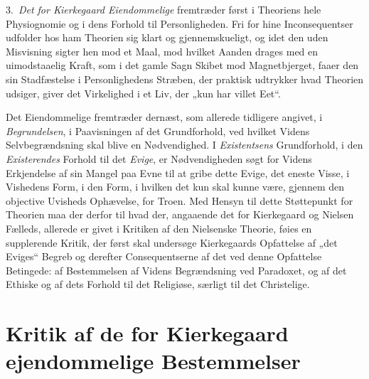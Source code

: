 \documentclass[12pt,a4paper]{book}
\newcommand{\opage}[1]{\marginnote{\footnotesize\textit{[#1]}}}
\begin{document}
3.~\emph{Det for Kierkegaard Eiendommelige} fremtræder først i Theoriens hele Physiognomie og i
dens Forhold til Personligheden. Fri for hine Inconsequentser udfolder hos ham Theorien sig
klart og gjennemskueligt, og idet den uden Misvisning sigter hen mod et Maal, mod hvilket Aanden
drages med en uimodstaaelig Kraft, som i det gamle Sagn Skibet mod Magnetbjerget, faaer den sin
Stadfæstelse i Personlighedens Stræben, der praktisk ud\opage{216}trykker hvad Theorien udsiger, giver det
Virkelighed i et Liv, der „kun har villet Eet“.

Det Eiendommelige fremtræder dernæst, som allerede tidligere angivet, i \emph{Begrundelsen}, i
Paavisningen af det Grundforhold, ved hvilket Videns Selvbegrændsning skal blive en
Nødvendighed. I \emph{Existentsens} Grundforhold, i den \emph{Existerendes} Forhold til det \emph{Evige}, er
Nødvendigheden søgt for Videns Erkjendelse af sin Mangel paa Evne til at gribe dette Evige, det
eneste Visse, i Vishedens Form, i den Form, i hvilken det kun skal kunne være, gjennem den
objective Uvisheds Ophævelse, for Troen. Med Hensyn til dette Støttepunkt for Theorien maa der
derfor til hvad der, angaaende det for Kierkegaard og Nielsen Fælleds, allerede er givet i
Kritiken af den Nielsenske Theorie, føies en supplerende Kritik, der først skal undersøge
Kierkegaards Opfattelse af „det Eviges“ Begreb og derefter Consequentserne af det ved denne
Opfattelse Betingede: af Bestemmelsen af Videns Begrændsning ved Paradoxet, og af det Ethiske og
af dets Forhold til det Religiøse, særligt til det Christelige.

\section{Kritik af de for Kierkegaard ejendommelige Bestemmelser}
\label{sec:kierkegaard-kritik}
\end{document}
